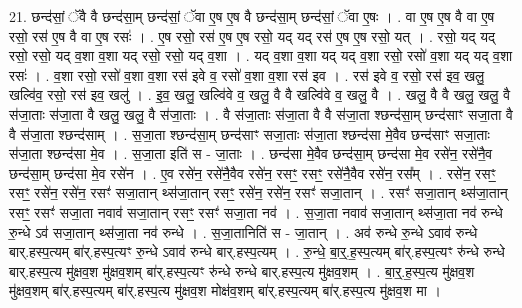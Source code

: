 \documentclass[17pt]{extarticle}
\begin{document}
21. छन्द॑सां॒ ॅवै वै छन्द॑सा॒म् छन्द॑सां॒ ॅवा ए॒ष ए॒ष वै छन्द॑सा॒म् छन्द॑सां॒ ॅवा ए॒षः । . वा ए॒ष ए॒ष वै वा ए॒ष रसो॒ रस॑ ए॒ष वै वा ए॒ष रसः॑ । . ए॒ष रसो॒ रस॑ ए॒ष ए॒ष रसो॒ यद् यद् रस॑ ए॒ष ए॒ष रसो॒ यत् । . रसो॒ यद् यद् रसो॒ रसो॒ यद् व॒शा व॒शा यद् रसो॒ रसो॒ यद् व॒शा । . यद् व॒शा व॒शा यद् यद् व॒शा रसो॒ रसो॑ व॒शा यद् यद् व॒शा रसः॑ । . व॒शा रसो॒ रसो॑ व॒शा व॒शा रस॑ इवे व॒ रसो॑ व॒शा व॒शा रस॑ इव । . रस॑ इवे व॒ रसो॒ रस॑ इव॒ खलु॒ खल्वि॑व॒ रसो॒ रस॑ इव॒ खलु॑ । . इ॒व॒ खलु॒ खल्वि॑वे व॒ खलु॒ वै वै खल्वि॑वे व॒ खलु॒ वै । . खलु॒ वै वै खलु॒ खलु॒ वै स॑जा॒ताः स॑जा॒ता वै खलु॒ खलु॒ वै स॑जा॒ताः । . वै स॑जा॒ताः स॑जा॒ता वै वै स॑जा॒ता श्छन्द॑सा॒म् छन्द॑साꣳ सजा॒ता वै वै स॑जा॒ता श्छन्द॑साम् । . स॒जा॒ता श्छन्द॑सा॒म् छन्द॑साꣳ सजा॒ताः स॑जा॒ता श्छन्द॑सा मे॒वैव छन्द॑साꣳ सजा॒ताः स॑जा॒ता श्छन्द॑सा मे॒व । . स॒जा॒ता इति॑ स - जा॒ताः । . छन्द॑सा मे॒वैव छन्द॑सा॒म् छन्द॑सा मे॒व रसे॑न॒ रसे॑नै॒व छन्द॑सा॒म् छन्द॑सा मे॒व रसे॑न । . ए॒व रसे॑न॒ रसे॑नै॒वैव रसे॑न॒ रसꣳ॒॒ रसꣳ॒॒ रसे॑नै॒वैव रसे॑न॒ रस᳚म् । . रसे॑न॒ रसꣳ॒॒ रसꣳ॒॒ रसे॑न॒ रसे॑न॒ रसꣳ॑ सजा॒तान् थ्स॑जा॒तान् रसꣳ॒॒ रसे॑न॒ रसे॑न॒ रसꣳ॑ सजा॒तान् । . रसꣳ॑ सजा॒तान् थ्स॑जा॒तान् रसꣳ॒॒ रसꣳ॑ सजा॒ता नवाव॑ सजा॒तान् रसꣳ॒॒ रसꣳ॑ सजा॒ता नव॑ । . स॒जा॒ता नवाव॑ सजा॒तान् थ्स॑जा॒ता नव॑ रुन्धे रु॒न्धे ऽव॑ सजा॒तान् थ्स॑जा॒ता नव॑ रुन्धे । . स॒जा॒तानिति॑ स - जा॒तान् । . अव॑ रुन्धे रु॒न्धे ऽवाव॑ रुन्धे बार्.हस्प॒त्यम् बा॑र्.हस्प॒त्यꣳ रु॒न्धे ऽवाव॑ रुन्धे बार्.हस्प॒त्यम् । . रु॒न्धे॒ बा॒र्॒.ह॒स्प॒त्यम् बा॑र्.हस्प॒त्यꣳ रु॑न्धे रुन्धे बार्.हस्प॒त्य मु॑क्षव॒श मु॑क्षव॒शम् बा॑र्.हस्प॒त्यꣳ रु॑न्धे रुन्धे बार्.हस्प॒त्य मु॑क्षव॒शम् । . बा॒र्॒.ह॒स्प॒त्य मु॑क्षव॒श मु॑क्षव॒शम् बा॑र्.हस्प॒त्यम् बा॑र्.हस्प॒त्य मु॑क्षव॒श मोक्ष॑व॒शम् बा॑र्.हस्प॒त्यम् बा॑र्.हस्प॒त्य मु॑क्षव॒श मा । \newline
\end{document}
